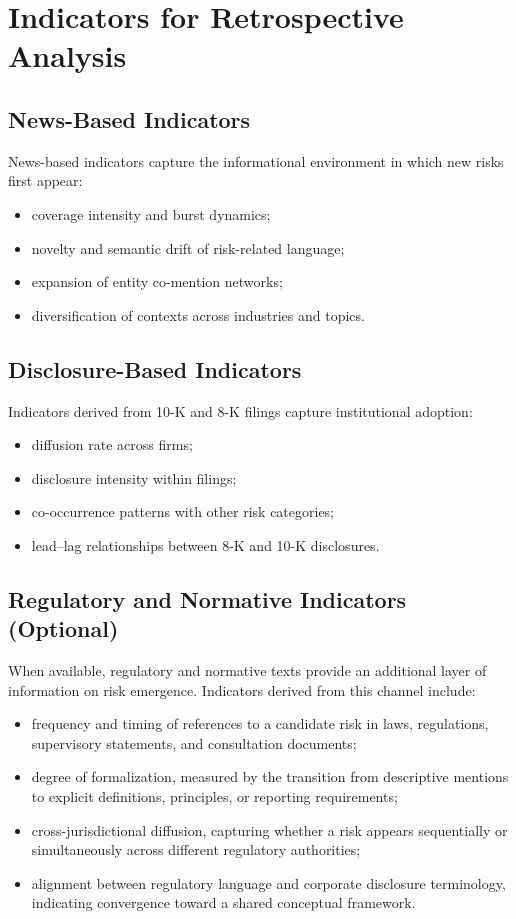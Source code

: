 \documentclass[11pt,a4paper]{article}
\begin{document}
\section{Indicators for Retrospective Analysis}

\subsection{News-Based Indicators}

News-based indicators capture the informational environment in which new risks first appear:
\begin{itemize}
    \item coverage intensity and burst dynamics;
    \item novelty and semantic drift of risk-related language;
    \item expansion of entity co-mention networks;
    \item diversification of contexts across industries and topics.
\end{itemize}

\subsection{Disclosure-Based Indicators}

Indicators derived from 10-K and 8-K filings capture institutional adoption:
\begin{itemize}
    \item diffusion rate across firms;
    \item disclosure intensity within filings;
    \item co-occurrence patterns with other risk categories;
    \item lead--lag relationships between 8-K and 10-K disclosures.
\end{itemize}

\subsection{Regulatory and Normative Indicators (Optional)}

When available, regulatory and normative texts provide an additional layer of information on risk emergence. Indicators derived from this channel include:

\begin{itemize}
    \item frequency and timing of references to a candidate risk in laws, regulations, supervisory statements, and consultation documents;
    \item degree of formalization, measured by the transition from descriptive mentions to explicit definitions, principles, or reporting requirements;
    \item cross-jurisdictional diffusion, capturing whether a risk appears sequentially or simultaneously across different regulatory authorities;
    \item alignment between regulatory language and corporate disclosure terminology, indicating convergence toward a shared conceptual framework.
\end{itemize}
\end{document}
